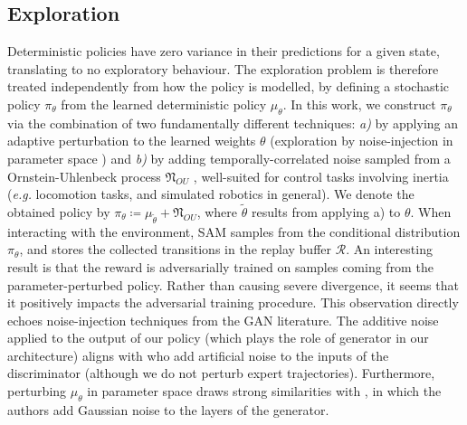 \subsection{Exploration}
Deterministic policies have zero variance in their
predictions for a given
state, translating to no exploratory behaviour.
The exploration problem is therefore treated independently from how the policy
is modelled, by defining a stochastic policy $\pi_\theta$
from the learned deterministic policy $\mu_\theta$.
In this work, we construct $\pi_\theta$ via the combination of
two fundamentally different techniques:
\textit{a)} by applying an adaptive perturbation to the learned weights $\theta$
(exploration by noise-injection in parameter space
\cite{Plappert2018-rl, Fortunato2017-af}) and
\textit{b)} by adding temporally-correlated noise sampled from a Ornstein-Uhlenbeck
process $\mathfrak{N}_{OU}$
\cite{Lillicrap2016-xa}, well-suited for control tasks involving
inertia (\textit{e.g.} locomotion tasks, and simulated robotics in general).
We denote the obtained policy by
$\pi_\theta \coloneqq \mu_{\tilde{\theta}} + \mathfrak{N}_{OU}$,
where $\tilde{\theta}$ results from applying a) to $\theta$.
When interacting with the environment, SAM
samples from the conditional distribution $\pi_\theta$,
and stores the collected transitions in the replay buffer $\mathcal{R}$.
An interesting result is that the reward is adversarially trained
on samples coming from the parameter-perturbed policy.
Rather than causing severe divergence, it seems that it positively impacts the
adversarial training procedure.
This observation directly echoes noise-injection techniques from the GAN
literature.
The additive noise applied to the output of our policy (which plays the role
of generator in our architecture)
aligns with
\cite{Arjovsky2017-ne}
who add artificial noise to the inputs of the discriminator (although we
do not perturb expert trajectories).
Furthermore, perturbing $\mu_\theta$ in parameter space
draws strong similarities with \cite{Zhao2017-bs}, in which the authors
add Gaussian noise to the layers of the generator.


